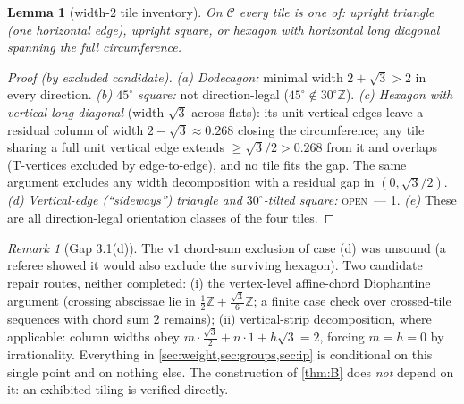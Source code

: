 \documentclass[11pt,a4paper,oneside]{article}
\theoremstyle{plain}
\newtheorem{lemma}[theorem]{Lemma}
\theoremstyle{definition}
\theoremstyle{remark}
\newtheorem{remark}[theorem]{Remark}
\newcommand{\ZZ}{\mathbb{Z}}
\newcommand{\statOPEN}{\textcolor{red!60!black}{\textsc{open}}}
\begin{document}
\begin{lemma}[width-2 tile inventory]\label{lem:inventory}
On $\mathcal{C}$ every tile is one of: upright triangle (one horizontal edge), upright
square, or hexagon with horizontal long diagonal spanning the full circumference.
\end{lemma}
\begin{proof}[Proof (by excluded candidate)]
\emph{(a) Dodecagon:} minimal width $2 + \sqrt3 > 2$ in every direction. \emph{(b)
$45^\circ$ square:} not direction-legal ($45^\circ \notin 30^\circ\ZZ$). \emph{(c) Hexagon
with vertical long diagonal} (width $\sqrt3$ across flats): its unit vertical edges leave a
residual column of width $2 - \sqrt3 \approx 0.268$ closing the circumference; any tile
sharing a full unit vertical edge extends $\ge \sqrt3/2 > 0.268$ from it and overlaps
(T-vertices excluded by edge-to-edge), and no tile fits the gap. The same argument excludes
any width decomposition with a residual gap in $(0, \sqrt3/2)$. \emph{(d) Vertical-edge
(``sideways'') triangle and $30^\circ$-tilted square:} \statOPEN\ --- \cref{gap:31d}. \emph{(e)}
These are all direction-legal orientation classes of the four tiles.
\end{proof}

\begin{remark}[Gap 3.1(d)]\label{gap:31d}
The v1 chord-sum exclusion of case (d) was unsound (a referee showed it would also exclude
the surviving hexagon). Two candidate repair routes, neither completed: (i) the
vertex-level affine-chord Diophantine argument (crossing abscissae lie in $\tfrac12\ZZ +
\tfrac{\sqrt3}{6}\ZZ$; a finite case check over crossed-tile sequences with chord sum $2$
remains); (ii) vertical-strip decomposition, where applicable: column widths obey
$m\cdot\tfrac{\sqrt3}{2} + n\cdot 1 + h\sqrt3 = 2$, forcing $m = h = 0$ by irrationality.
Everything in \cref{sec:weight,sec:groups,sec:ip} is conditional on this single point and on
nothing else. The construction of \cref{thm:B} does \emph{not} depend on it: an exhibited
tiling is verified directly.
\end{remark}
\end{document}

